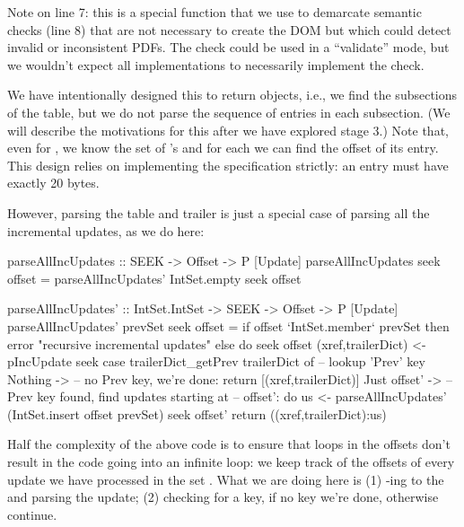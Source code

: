 Note  on line 7: this is a special function that we
use to demarcate semantic checks (line 8) that are not necessary to
create the DOM but which could detect invalid or inconsistent PDFs.
%
The check could be used in a ``validate'' mode, but we wouldn't expect
all implementations to necessarily implement the check.

We have intentionally designed this to return  objects,
i.e., we find the subsections of the \xref{} table, but we do not
parse the sequence of \xref{} entries in each subsection.
(We will describe the motivations for this after
we have explored stage 3.)
%
Note that, even for ,
we know the set of \objid{}'s and for each we can find the offset
of its \xref{} entry.  This design relies on implementing
the specification strictly: an \xref{} entry must have exactly 20 bytes.

However, parsing the \xref{} table and trailer is just a special case
of parsing all the incremental updates, as we do here:

\lstset{numbers=right}
\begin{code}
parseAllIncUpdates :: SEEK -> Offset -> P [Update]
parseAllIncUpdates seek offset =
  parseAllIncUpdates' IntSet.empty seek offset

parseAllIncUpdates' :: IntSet.IntSet -> SEEK -> Offset -> P [Update]
parseAllIncUpdates' prevSet seek offset =
    if offset `IntSet.member` prevSet then
      error "recursive incremental updates"
    else
      do
      seek offset
      (xref,trailerDict) <- pIncUpdate seek
      case trailerDict_getPrev trailerDict of   -- lookup 'Prev' key
        Nothing      -> -- no Prev key, we're done:
                        return [(xref,trailerDict)]
        Just offset' -> -- Prev key found, find updates starting at
                        -- offset':
                        do
                        us <- parseAllIncUpdates'
                                (IntSet.insert offset prevSet)
                                seek
                                offset'
                        return ((xref,trailerDict):us)
\end{code}
\lstset{numbers=none}

Half the complexity of the above code is to ensure that loops in
the  offsets don't result in the code going
into an infinite loop: we keep track of the offsets of every update
we have processed in the set .
What we are doing here is
(1) -ing to the  and parsing the update;
(2) checking for a  key, if no key we're done, otherwise
    continue.

